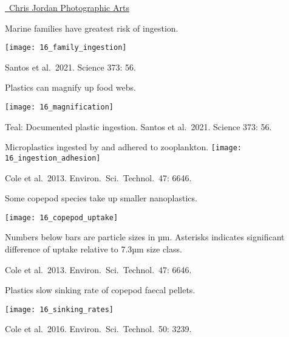\documentclass[t]{beamer}
\begin{document}
{
\begin{frame}


\vfilll

\tinynofill \textcolor{white}{\href{http://chrisjordan.com/gallery/midway/}{\textcopyright\ Chris Jordan Photographic Arts}} \end{frame}
}
%
 
\begin{frame}{Marine families have greatest risk of ingestion.}

\texttt{[image: 16\_family\_ingestion]}

\tinyfill Santos et al.\ 2021. Science 373: 56.
\end{frame}
%
 
\begin{frame}{Plastics can magnify up food webs.}

\centering
\texttt{[image: 16\_magnification]}

\vfilll

\tiny Teal: Documented plastic ingestion. \hfill Santos et al.\ 2021. Science 373: 56.
\end{frame}

\begin{frame}{Microplastics ingested by and adhered to zooplankton.}
\centering
\texttt{[image: 16\_ingestion\_adhesion]}

\tinyfill Cole et al.\ 2013. Environ.\ Sci.\ Technol.\ 47: 6646.

\end{frame}

%

\begin{frame}{Some copepod species take up smaller nanoplastics.}

\texttt{[image: 16\_copepod\_uptake]}

\hangpara Numbers below bars are particle sizes in µm. Asterisks indicates
significant difference of uptake relative to 7.3µm size class.

\tinyfill Cole et al.\ 2013. Environ.\ Sci.\ Technol.\ 47: 6646.

\end{frame}

%

\begin{frame}{Plastics slow sinking rate of copepod faecal pellets.}

\centering
\texttt{[image: 16\_sinking\_rates]}

\tinyfill Cole et al.\ 2016. Environ.\ Sci.\ Technol.\ 50: 3239.

\end{frame}
\end{document}
